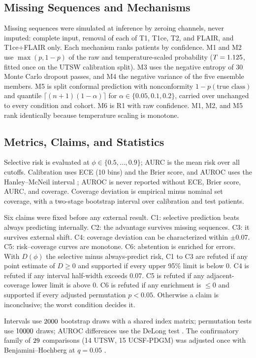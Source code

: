 \documentclass[conference]{IEEEtran}
\begin{document}
\subsection{Missing Sequences and Mechanisms}
Missing sequences were simulated at inference by zeroing channels, never imputed: complete input, removal of each of T1, T1ce, T2, and FLAIR, and T1ce+FLAIR only. Each mechanism ranks patients by confidence. M1 and M2 use $\max(p,1-p)$ of the raw and temperature-scaled probability ($T=1.125$, fitted once on the UTSW calibration split). M3 uses the negative entropy of 30 Monte Carlo dropout passes, and M4 the negative variance of the five ensemble members. M5 is split conformal prediction with nonconformity $1-p(\text{true class})$ and quantile $\lceil(n+1)(1-\alpha)\rceil$ for $\alpha\in\{0.05,0.1,0.2\}$, carried over unchanged to every condition and cohort. M6 is R1 with raw confidence. M1, M2, and M5 rank identically because temperature scaling is monotone.

\subsection{Metrics, Claims, and Statistics}
Selective risk is evaluated at $\phi\in\{0.5,\dots,0.9\}$; AURC is the mean risk over all cutoffs. Calibration uses ECE (10 bins) and the Brier score, and AUROC uses the Hanley--McNeil interval \cite{hanley1982}; AUROC is never reported without ECE, Brier score, AURC, and coverage. Coverage deviation is empirical minus nominal set coverage, with a two-stage bootstrap interval over calibration and test patients.

Six claims were fixed before any external result. C1: selective prediction beats always predicting internally. C2: the advantage survives missing sequences. C3: it survives external shift. C4: coverage deviation can be characterized within $\pm0.07$. C5: risk--coverage curves are monotone. C6: abstention is enriched for errors. With $D(\phi)$ the selective minus always-predict risk, C1 to C3 are refuted if any point estimate of $D\ge0$ and supported if every upper 95\% limit is below 0. C4 is refuted if any interval half-width exceeds $0.07$. C5 is refuted if any adjacent-coverage lower limit is above 0. C6 is refuted if any enrichment is $\le0$ and supported if every adjusted permutation $p<0.05$. Otherwise a claim is inconclusive; the worst condition decides it.

Intervals use $2000$ bootstrap draws with a shared index matrix; permutation tests use $10000$ draws; AUROC differences use the DeLong test \cite{delong1988}. The confirmatory family of $29$ comparisons (14 UTSW, 15 UCSF-PDGM) was adjusted once with Benjamini--Hochberg at $q=0.05$ \cite{benjamini1995}.
\end{document}
